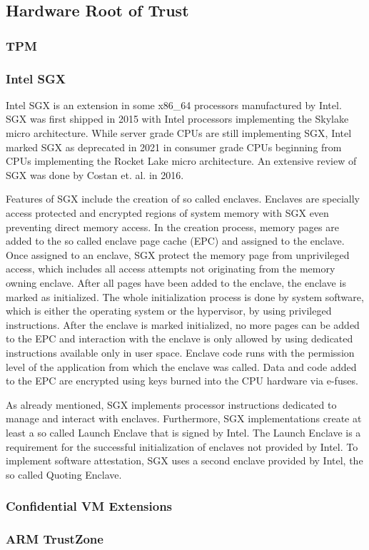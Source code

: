 
\subsection{Hardware Root of Trust}
\subsubsection{TPM}

\subsubsection{Intel SGX}
Intel SGX is an extension in some x86\_64 processors manufactured by Intel. SGX was first shipped in 2015 with Intel
processors implementing the Skylake micro architecture. While server grade CPUs are still implementing SGX, Intel marked
SGX as deprecated in 2021 in consumer grade CPUs beginning from CPUs implementing the Rocket Lake micro architecture. An
extensive review of SGX was done by Costan et. al. in 2016.\cite{costan2016intel}

Features of SGX include the creation of so called enclaves. Enclaves are specially access protected and encrypted
regions of system memory with SGX even preventing direct memory access. In the creation process, memory pages are
added to the so called enclave page cache (EPC) and assigned to the enclave. Once assigned to an enclave, SGX protect
the memory page from unprivileged access, which includes all access attempts not originating from the memory owning
enclave. After all pages have been added to the enclave, the enclave is marked as initialized. The whole initialization
process is done by system software, which is either the operating system or the hypervisor, by using privileged
instructions. After the enclave is marked initialized, no more pages can be added to the EPC and interaction with the
enclave is only allowed by using dedicated instructions available only in user space. Enclave code runs with the
permission level of the application from which the enclave was called. Data and code added to the EPC are encrypted
using keys burned into the CPU hardware via e-fuses.

As already mentioned, SGX implements processor instructions dedicated to manage and interact with enclaves. Furthermore,
SGX implementations create at least a so called Launch Enclave that is signed by Intel. The Launch Enclave is a
requirement for the successful initialization of enclaves not provided by Intel. To implement software attestation,
SGX uses a second enclave provided by Intel, the so called Quoting Enclave.

\subsubsection{Confidential VM Extensions}
\subsubsection{ARM TrustZone}

